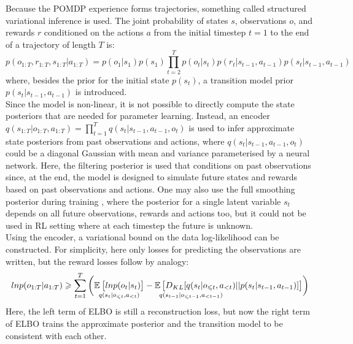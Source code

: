 Because the POMDP experience forms trajectories, something called structured variational inference is used. The joint probability of states $s$, observations $o$, and rewards $r$ conditioned on the actions $a$ from the initial timestep $t = 1$ to the end of a trajectory of length $T$ is:
$$p(o_{1:T}, r_{1:T}, s_{1:T} | a_{1:T}) = p(o_1|s_1)p(s_1) \prod^T_{t=2} p(o_t|s_t)p(r_t|s_{t-1}, a_{t-1})p(s_t|s_{t−1}, a_{t−1})$$
where, besides the prior for the initial state $p(s_t)$, a transition model prior $p(s_t|s_{t−1}, a_{t−1})$ is introduced. \\
Since the model is non-linear, it is not possible to directly compute the state posteriors that are needed for parameter learning. Instead, an encoder $q(s_{1:T} | o_{1:T}, a_{1:T}) = \prod^T_{t=1} q(s_t | s_{t−1}, a_{t−1}, o_t)$ is used to infer approximate state posteriors from past observations and actions, where $q(s_t | s_{t−1}, a_{t−1}, o_t)$ could be a diagonal Gaussian with mean and variance parameterised by a neural network. Here, the filtering posterior \cite{Algo.Filtering} is used that conditions on past observations since, at the end, the model is designed to simulate future states and rewards based on past observations and actions. One may also use the full smoothing posterior during training \cite{Algo.Smoothing}, where the posterior for a single latent variable $s_t$ depends on all future observations, rewards and actions too, but it could not be used in RL setting where at each timestep the future is unknown. \\
Using the encoder, a variational bound on the data log-likelihood can be constructed. For simplicity, here only losses for predicting the observations are written, but the reward losses follow by analogy:
$$ln p(o_{1:T} | a_{1:T}) \geqslant \sum^T_{t=1} \bigg( \underset{q(s_t|o_{\leqslant t}, a_{<t})}{\operatorname{\mathbb{E}}_{} \big[ ln p(o_t|s_t) \big]} - \underset{q(s_{t-1}|o_{\leqslant t-1}, a_{<t-1})\hphantom{offset==to=====left}}{\operatorname{\mathbb{E}} \big[ D_{KL}[q(s_t|o_{\leqslant t}, a_{<t})||p(s_t|s_{t-1}, a_{t-1})] \big]} \bigg)$$
Here, the left term of ELBO is still a reconstruction loss, but now the right term of ELBO trains the approximate posterior and the transition model to be consistent with each other.
